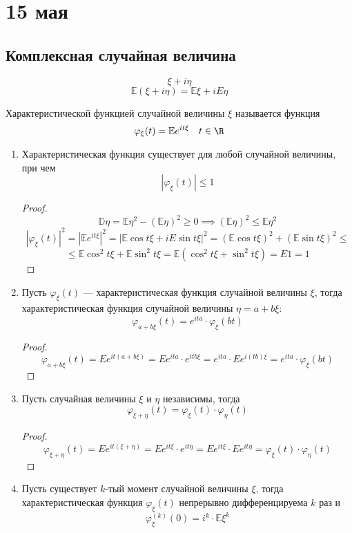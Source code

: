 \chapter{15 мая}

\section{Комплексная случайная величина}
\[ \xi + i\eta \]
\[ \mathbb{E}(\xi + i \eta) = \mathbb{E}\xi + iE\eta \]
\begin{definition}
    Характеристической функцией случайной величины \(\xi\) называется функция \[\varphi_{\xi}(t) = \mathbb{E} e^{it\xi}\quad t \in \R\]
\end{definition}

\begin{prop}\itemfix
    \begin{enumerate}
        \item
              Характеристическая функция существует для любой случайной величины, при чем
              \[ |\varphi_\xi(t)| \le 1 \]

              \begin{proof}
                  \[ \mathbb{D}\eta  = \mathbb{E}\eta^2 - (\mathbb{E}\eta)^2 \ge 0 \implies (\mathbb{E}\eta)^2 \le \mathbb{E}\eta^2 \]
                  \[ |\varphi_\xi(t)|^2 = |\mathbb{E} e^{it\xi}|^2 = |\mathbb{E}\cos t\xi + iE\sin t\xi|^2 = (\mathbb{E}\cos t\xi)^2 + (\mathbb{E}\sin t\xi)^2 \le   \]
                  \[ \le \mathbb{E}\cos^2t\xi + \mathbb{E}\sin^2 t\xi = \mathbb{E}(\cos^2t\xi + \sin^2t\xi) = E1 = 1 \]
              \end{proof}
        \item
              Пусть \(\varphi_\xi(t)\) --- характеристическая функция случайной величины \(\xi\), тогда характеристическая функция случайной величины \(\eta = a + b\xi\):
              \[ \varphi_{a + b\xi}(t) = e^{ita}\cdot\varphi_\xi(bt)\]

              \begin{proof}
                  \[ \varphi_{a + b\xi}(t) = Ee^{it(a + b\xi)} = Ee^{ita}\cdot e^{itb\xi} = e^{ita}\cdot Ee^{i(tb)\xi} = e^{ita} \cdot \varphi_\xi(bt) \]
              \end{proof}
        \item
              Пусть случайная величины \(\xi\) и \(\eta\) независимы, тогда
              \[ \varphi_{\xi + \eta}(t) = \varphi_\xi(t) \cdot \varphi_\eta(t) \]

              \begin{proof}
                  \[ \varphi_{\xi + \eta}(t)  = Ee^{it(\xi + \eta)} = Ee^{it\xi}\cdot e^{it\eta} = Ee^{it\xi}\cdot Ee^{it\eta} = \varphi_\xi(t)\cdot \varphi_\eta(t) \]
              \end{proof}
        \item
              Пусть существует \(k\)-тый момент случайной величины \(\xi\), тогда характеристическая функция \(\varphi_\xi(t)\) непрерывно дифференцируема \(k\) раз и \[\varphi_\xi^{(k)}(0) = i^k\cdot \mathbb{E}\xi^k\]


\end{enumerate}
\end{prop}
